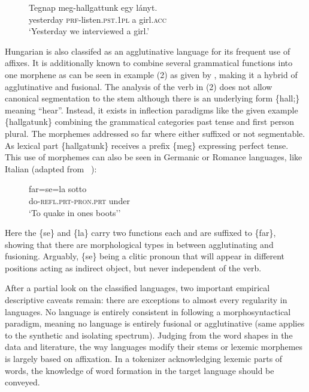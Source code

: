 \begin{figure}[h]
\centering
\label{fig:hun}
\begin{exe}
    \ex
    \gll  Tegnap meg-hallgattunk egy lányt. \\
    yesterday \textsc{prf}-listen.\textsc{pst.1pl} a girl.\textsc{acc}\\
    \glt  `Yesterday we interviewed a girl.'
\end{exe}
\end{figure}


Hungarian is also classifed as an agglutinative language for its frequent use of affixes.
It is additionally known to combine several grammatical functions into one morphene as can be seen in example (2) as given by \textcite[262]{hunverbs}, making it a hybrid of agglutinative and fusional.
The analysis of the verb in (2) does not allow canonical segmentation to the stem although there is an underlying form \{hall;\textasteriskcentered\} meaning \textquotedblleft hear\textquotedblright.
Instead, it exists in inflection paradigms like the given example \{hallgatunk\} combining the grammatical categories past tense and first person plural.
The morphemes addressed so far where either suffixed or not segmentable.
As lexical part \{hallgatunk\} receives a prefix \{meg\} expressing perfect tense.
This use of morphemes can also be seen in Germanic or Romance languages, like Italian (adapted from ~\textcite[163]{itaverbs}):

\begin{figure}[H]
\centering
    \label{fig:ita}
    \begin{exe}
        \ex
        \gll  far=se=la sotto \\
        do-\textsc{refl.prt}-\textsc{pron.prt} under\\
        \glt  `To quake in one\textquotesingle s boots’'
    \end{exe}
\end{figure}

Here the \{se\} and \{la\} carry two functions each and are suffixed to \{far\}, showing that there are morphological types in between agglutinating and fusioning.
Arguably, \{se\} being a clitic pronoun that will appear in different positions acting as indirect object, but never independent of the verb.


After a partial look on the classified languages, two important empirical descriptive caveats remain: there are exceptions to almost every regularity in languages.
No language is entirely consistent in following a morphosyntactical paradigm, meaning no language is entirely fusional or agglutinative (same applies to the synthetic and isolating spectrum).
Judging from the word shapes in the data and literature, the way languages modify their stems or lexemic morphemes is largely based on affixation.
In a tokenizer acknowledging lexemic parts of words, the knowledge of word formation in the target language should be conveyed.